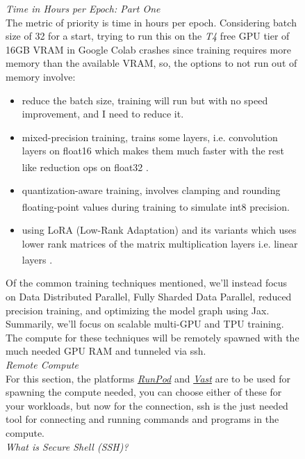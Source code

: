 \documentclass[12pt]{article}
\newcommand{\customtext}[3]{%
    \vspace{#2} %
    \fontsize{13}{8}\textcolor{#1}{\textit{#3}}%
}
\newcommand{\sidecite}[1]{\textsuperscript{\textcolor{blue}{\textbf{\scriptsize#1}}}}
\newcommand{\maincitecount}{\sidecite{\stepcounter{maincite}\themaincite}}
\begin{document}
\begin{figure}[!htb]
    \begin{minipage}[t]{0.65\textwidth}
    \raggedright
    \customtext{xtitle}{0em}{Time in Hours per Epoch: Part One}\\
    The metric of priority is time in hours per epoch. Considering batch 
    size of 32 for a start, trying to run this on the {\it T4} free GPU tier 
    of 16GB VRAM in Google Colab crashes since training requires more memory 
    than the available VRAM, so, the options to not run out of memory involve: 
    \begin{itemize}[left=0pt,topsep=0pt,itemsep=-1ex,parsep=0ex]
        \item reduce the batch size, training will run but with no speed improvement, 
        and I need to reduce it.
        \item mixed-precision training, trains some layers, i.e. convolution layers 
        on float16 which makes them much faster with the rest like reduction ops on float32
        \maincitecount.
        \item quantization-aware training, involves clamping and rounding floating-point 
        values during training to simulate int8 precision\maincitecount.
        \item using LoRA (Low-Rank Adaptation) and its variants which uses lower rank 
        matrices of the matrix multiplication layers i.e. linear layers \maincitecount. 
    \end{itemize}
Of the common training techniques mentioned, we'll instead focus on 
Data Distributed Parallel, Fully Sharded Data Parallel, reduced precision 
training, and optimizing the model graph using Jax. Summarily, we'll focus on 
scalable multi-GPU and TPU training. The compute for these techniques will 
be remotely spawned with the much needed GPU RAM and tunneled via ssh.
\vspace{1em}\\
\customtext{xtitle}{0em}{Remote Compute}\\
For this section, the platforms {\it \href{https://www.runpod.io}{RunPod}} and 
{\it\href{https://vast.ai}{Vast}} are to be used for spawning the compute needed, 
you can choose either of these for your workloads, but now for the connection, 
ssh is the just needed tool for connecting and running commands and programs in 
the compute.
\vspace{1em}\\
\customtext{xtitle}{0em}{What is Secure Shell (SSH)?}\\

\end{minipage}
\end{figure}
\end{document}
